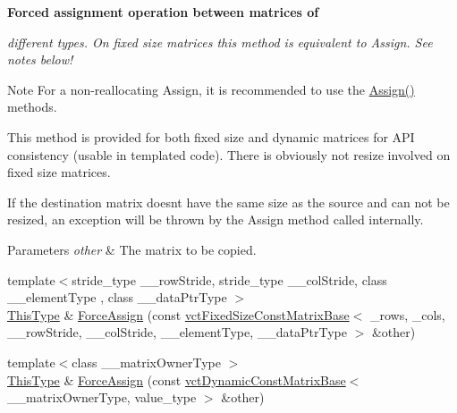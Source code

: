 \begin{Indent}{\bf Forced assignment operation between matrices of}\par
{\em different types. On fixed size matrices this method is equivalent to Assign. See notes below!

\begin{DoxyNote}{Note}
For a non-\/reallocating Assign, it is recommended to use the \hyperlink{classvct_fixed_size_matrix_base_a1bf6174aa97f71d7d33df7a92a368683}{Assign()} methods.

This method is provided for both fixed size and dynamic matrices for A\+P\+I consistency (usable in templated code). There is obviously not resize involved on fixed size matrices.

If the destination matrix doesn\textquotesingle{}t have the same size as the source and can not be resized, an exception will be thrown by the Assign method called internally.
\end{DoxyNote}

\begin{DoxyParams}{Parameters}
{\em other} & The matrix to be copied. \\
\hline
\end{DoxyParams}
}\begin{DoxyCompactItemize}
\item 
{\footnotesize template$<$stride\+\_\+type \+\_\+\+\_\+row\+Stride, stride\+\_\+type \+\_\+\+\_\+col\+Stride, class \+\_\+\+\_\+element\+Type , class \+\_\+\+\_\+data\+Ptr\+Type $>$ }\\\hyperlink{classvct_fixed_size_const_matrix_base_a7ec66a96ed7e08ce9ff54093133c9d8d}{This\+Type} \& \hyperlink{classvct_fixed_size_matrix_base_a5b1643ef718915ca085dd69af8a2b994}{Force\+Assign} (const \hyperlink{classvct_fixed_size_const_matrix_base}{vct\+Fixed\+Size\+Const\+Matrix\+Base}$<$ \+\_\+rows, \+\_\+cols, \+\_\+\+\_\+row\+Stride, \+\_\+\+\_\+col\+Stride, \+\_\+\+\_\+element\+Type, \+\_\+\+\_\+data\+Ptr\+Type $>$ \&other)
\item 
{\footnotesize template$<$class \+\_\+\+\_\+matrix\+Owner\+Type $>$ }\\\hyperlink{classvct_fixed_size_const_matrix_base_a7ec66a96ed7e08ce9ff54093133c9d8d}{This\+Type} \& \hyperlink{classvct_fixed_size_matrix_base_a21e9dcb38745fe99aab58b482d2f2df1}{Force\+Assign} (const \hyperlink{classvct_dynamic_const_matrix_base}{vct\+Dynamic\+Const\+Matrix\+Base}$<$ \+\_\+\+\_\+matrix\+Owner\+Type, value\+\_\+type $>$ \&other)
\end{DoxyCompactItemize}
\end{Indent}
